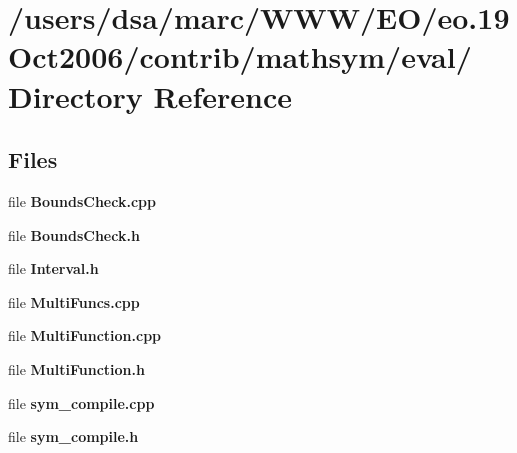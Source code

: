 \section{/users/dsa/marc/WWW/EO/eo.19Oct2006/contrib/mathsym/eval/ Directory Reference}
\label{dir_000009}
\subsection*{Files}
\begin{CompactItemize}
\item 
file {\bf BoundsCheck.cpp}
\item 
file {\bf BoundsCheck.h}
\item 
file {\bf Interval.h}
\item 
file {\bf MultiFuncs.cpp}
\item 
file {\bf MultiFunction.cpp}
\item 
file {\bf MultiFunction.h}
\item 
file {\bf sym_compile.cpp}
\item 
file {\bf sym_compile.h}
\end{CompactItemize}
